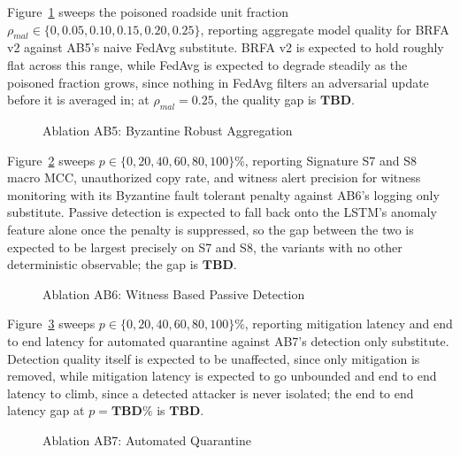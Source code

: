 \documentclass[final,5p,twocolumn]{elsarticle}
\theoremstyle{remark}
\theoremstyle{plain}
\newcommand{\TBD}{\textbf{TBD}} %
\begin{document}
Figure~\ref{fig:ab5} sweeps the poisoned roadside unit fraction
$\rho_{mal} \in \{0, 0.05, 0.10, 0.15, 0.20, 0.25\}$, reporting aggregate
model quality for BRFA v2 against AB5's naive FedAvg substitute. BRFA v2
is expected to hold roughly flat across this range, while FedAvg is
expected to degrade steadily as the poisoned fraction grows, since
nothing in FedAvg filters an adversarial update before it is averaged in;
at $\rho_{mal}{=}0.25$, the quality gap is $\TBD$.
\begin{figure}[!t]
	\centering
	\caption{Ablation AB5: Byzantine Robust Aggregation}
	\label{fig:ab5}
\end{figure}

Figure~\ref{fig:ab6} sweeps $p \in \{0,20,40,60,80,100\}\%$, reporting
Signature S7 and S8 macro MCC, unauthorized copy rate, and witness alert
precision for witness monitoring with its Byzantine fault tolerant
penalty against AB6's logging only substitute. Passive detection is
expected to fall back onto the LSTM's anomaly feature alone once the
penalty is suppressed, so the gap between the two is expected to be
largest precisely on S7 and S8, the variants with no other deterministic
observable; the gap is $\TBD$.
\begin{figure}[!t]
	\centering
	\caption{Ablation AB6: Witness Based Passive Detection}
	\label{fig:ab6}
\end{figure}

Figure~\ref{fig:ab7} sweeps $p \in \{0,20,40,60,80,100\}\%$, reporting
mitigation latency and end to end latency for automated quarantine
against AB7's detection only substitute. Detection quality itself is
expected to be unaffected, since only mitigation is removed, while
mitigation latency is expected to go unbounded and end to end latency to
climb, since a detected attacker is never isolated; the end to end
latency gap at $p{=}\TBD\%$ is $\TBD$.
\begin{figure}[!t]
	\centering
	\caption{Ablation AB7: Automated Quarantine}
	\label{fig:ab7}
\end{figure}
\end{document}

